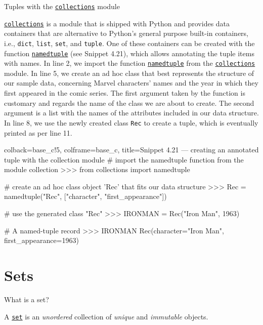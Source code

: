 \documentclass[a4paper,11pt]{book}
\numberwithin{figure}{chapter}
\numberwithin{table}{chapter}
\newcommand{\question}[1]{%
    \begin{tcolorbox}[colback=comp_c!10,colframe=comp_c,sidebyside align=top,width=\linewidth,before skip=1ex]
        #1
    \end{tcolorbox}%
    \switchcolumn%
}
\newcommand{\note}[1]{%
    \begin{tcolorbox}[colback=white!0,colframe=white!10,width=\linewidth,before skip=1ex]
        #1
    \end{tcolorbox}         
}
\begin{document}
\begin{paracol}{2}
	\question{\raggedright Tuples with the \href{https://docs.python.org/3/library/collections.html}{\texttt{collections}} module}
	\note{\href{https://docs.python.org/3/library/collections.html}{\texttt{collections}} is a module that is shipped with Python and provides data containers that are alternative to Python's general purpose built-in containers, i.e., \texttt{dict}, \texttt{list}, \texttt{set}, and \texttt{tuple}. One of these containers can be created with the function \href{https://docs.python.org/3/library/collections.html#collections.namedtuple}{\texttt{namedtuple}} (see Snippet 4.21), which allows annotating the tuple items with names. In line 2, we import the function \href{https://docs.python.org/3/library/collections.html#collections.namedtuple}{\texttt{namedtuple}} from the \href{https://docs.python.org/3/library/collections.html#collections}{\texttt{collections}} module. In line 5, we create an ad hoc class that best represents the structure of our sample data, concerning Marvel characters' names and the year in which they first appeared in the comic series. The first argument taken by the function is customary and regards the name of the class we are about to create. The second argument is a list with the names of the attributes included in our data structure. In line 8, we use the newly created class \texttt{Rec} to create a tuple, which is eventually printed as per line 11.}
\end{paracol}

\begin{pythoncode}[linenos=true,]{colback=base_c!5, colframe=base_c, title=\sffamily Snippet 4.21 --- creating an annotated tuple with the collection module}
# import the namedtuple function from the module collection
>>> from collections import namedtuple

# create an ad hoc class object 'Rec' that fits our data structure
>>> Rec = namedtuple("Rec", ["character", "first_appearance"])

# use the generated class "Rec"
>>> IRONMAN = Rec("Iron Man", 1963)

# A named-tuple record
>>> IRONMAN
Rec(character="Iron Man", first_appearance=1963)
\end{pythoncode}

\section{Sets}

\begin{paracol}{2}
	\question{\raggedright What is a set?}
	\note{A \href{https://docs.python.org/3/tutorial/datastructures.html#sets}{\texttt{set}} is an \emph{unordered} collection of \emph{unique} and \emph{immutable} objects.}
\end{paracol}
\end{document}
